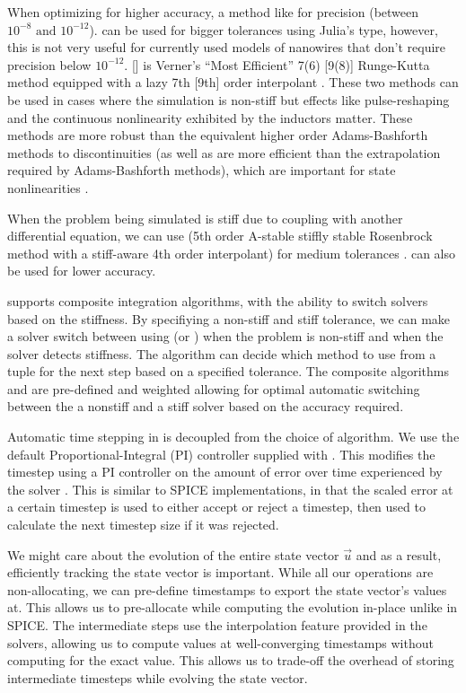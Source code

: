 When optimizing for higher accuracy, a method like  for  precision (between $10^{-8}\text{ and }10^{-12}$).  can be used for bigger tolerances using Julia's 
 type, however, this is not very useful for currently used models of nanowires that
don't require precision below $10^{-12}$.  [] is Verner's ``Most Efficient'' 7(6) [9(8)] Runge-Kutta 
method equipped with a lazy 7th [9th] order interpolant \cite{vern}. These two methods can be used in
cases where the simulation is non-stiff but effects like pulse-reshaping and the continuous nonlinearity
exhibited by the inductors matter. These methods are more robust than the equivalent higher order 
Adams-Bashforth methods to discontinuities (as well as are more efficient than the extrapolation
required by Adams-Bashforth methods), which are important for state nonlinearities \cite{ODESolver-diffeq}.

When the problem being simulated is stiff due to coupling with another differential equation, we can
use  (5th order A-stable stiffly stable Rosenbrock method with a stiff-aware 4th order interpolant)
for medium tolerances \cite{ODESolver-diffeq}.  can also be used for lower accuracy.

 supports composite integration algorithms, with the ability to switch
solvers based on the stiffness. By specifiying a non-stiff and stiff tolerance, we can make a solver switch
between using  (or ) when the problem is non-stiff and  when the
solver detects stiffness. The  algorithm can decide which method to use from a tuple 
for the next step based on a specified tolerance. The composite algorithms  and  
are pre-defined and weighted allowing for optimal automatic switching between the a nonstiff and a stiff solver
based on the accuracy required.

Automatic time stepping in  is decoupled from the choice of algorithm.
We use the default Proportional-Integral (PI) controller supplied with .
This modifies the timestep using a PI controller on the amount of error over time experienced by the
solver \cite{timestepping_alg_PI}. 
This is similar to SPICE implementations, in that the scaled error at a certain timestep is used to either
accept or reject a timestep, then used to calculate the next timestep size if it was rejected.

We might care about the evolution of the entire state vector $\vec u$ and as a result, efficiently
tracking the state vector is important. While all our operations are non-allocating, we can pre-define
timestamps to export the state vector's values at. This allows us to pre-allocate while computing
the evolution in-place unlike in SPICE. The intermediate steps use the interpolation feature provided
in the solvers, allowing us to compute values at well-converging timestamps without computing for the
exact value. This allows us to trade-off the overhead of storing intermediate timesteps while evolving
the state vector.

